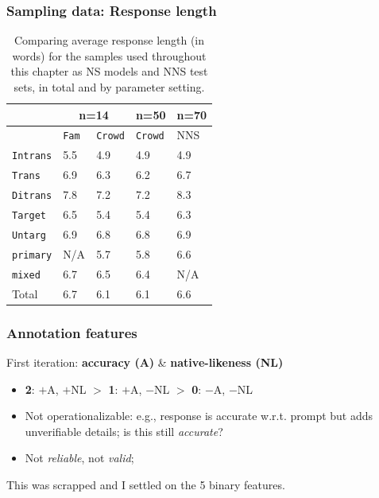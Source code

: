 \documentclass[handout,xcolor={dvipsnames}]{beamer}
\newcommand{\param}[1]{\texttt{#1}}
\begin{document}
\begin{frame}
\frametitle{Sampling data: Response length}
\small
\begin{table}[htb!]
\begin{center}
\setlength{\tabcolsep}{.5em}
\begin{tabular}{|l||l|l|l||l|}
\hline
  & \multicolumn{2}{c|}{n=14} & n=50 & n=70\\
\hline
   & \param{Fam} & \param{Crowd} & \param{Crowd} 	& NNS			\\ \hline
\hline
\param{Intrans} & 5.5 	  		& 4.9 			& 4.9 		& 4.9 			\\ \hline
\param{Trans}   & 6.9          	& 6.3          	& 6.2       & 6.7    	    \\ \hline
\param{Ditrans} & 7.8          	& 7.2          	& 7.2       & 8.3    	    \\ \hline
\hline
\param{Target}  & 6.5 			& 5.4	 		& 5.4 		& 6.3			\\ \hline
\param{Untarg}  & 6.9        	& 6.8        	& 6.8    	& 6.9        	\\ \hline
\hline
\param{prim\-a\-ry} & N/A        	& 5.7 			& 5.8		& 6.6		 	\\ \hline
\param{mix\-ed}   & 6.7          	& 6.5          	& 6.4       & N/A	        \\ \hline
\hline
Total	& 6.7			& 6.1			& 6.1		& 6.6			\\ \hline
\end{tabular}
\caption{\label{tab:response-length}Comparing average response length (in words) for the samples used throughout this chapter as NS models and NNS test sets, in total and by parameter setting.}
\end{center}
\end{table}

\end{frame}

\begin{frame}
\frametitle{Annotation features}

\normalsize
\pause
First iteration: \textbf{accuracy (A)} \& \textbf{native-likeness (NL)}
\begin{itemize}
\pause
\item \textbf{2}: $+$A, $+$NL $>$ \textbf{1}: $+$A, $-$NL $>$ \textbf{0}: $-$A, $-$NL
\pause
\item Not operationalizable: e.g., response is accurate w.r.t. prompt but adds unverifiable details; is this still \textit{accurate}?
\item Not \textit{reliable}, not \textit{valid};
\end{itemize}
\pause
This was scrapped and I settled on the 5 binary features.

\end{frame}
\end{document}
